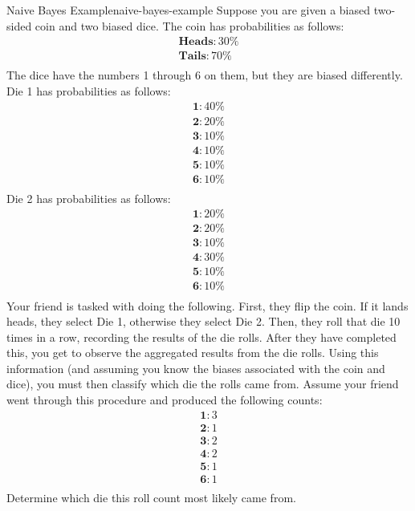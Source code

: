 \begin{example}{Naive Bayes Example}{naive-bayes-example}
	Suppose you are given a biased two-sided coin and two biased dice. The coin has probabilities as follows:
	\begin{align*}
		\textbf{Heads}: 30\% \\
		\textbf{Tails}: 70\% \\
	\end{align*}
	The dice have the numbers 1 through 6 on them, but they are biased differently. Die 1 has probabilities as follows:
	\begin{align*}
		\textbf{1}: 40\% \\
		\textbf{2}: 20\% \\
		\textbf{3}: 10\% \\
		\textbf{4}: 10\% \\
		\textbf{5}: 10\% \\
		\textbf{6}: 10\% \\
	\end{align*}
	Die 2 has probabilities as follows:
	\begin{align*}
		\textbf{1}: 20\% \\
		\textbf{2}: 20\% \\
		\textbf{3}: 10\% \\
		\textbf{4}: 30\% \\
		\textbf{5}: 10\% \\
		\textbf{6}: 10\% \\
	\end{align*}
	Your friend is tasked with doing the following. First, they flip the coin. If it lands heads, they select Die 1, otherwise they select Die 2. Then, they roll that die 10 times in a row, recording the results of the die rolls. After they have completed this, you get to observe the aggregated results from the die rolls. Using this information (and assuming you know the biases associated with the coin and dice), you must then classify which die the rolls came from. Assume your friend went through this procedure and produced the following counts:
	\begin{align*}
		\textbf{1}: 3 \\
		\textbf{2}: 1 \\
		\textbf{3}: 2 \\
		\textbf{4}: 2 \\
		\textbf{5}: 1 \\
		\textbf{6}: 1 \\
	\end{align*}
	Determine which die this roll count most likely came from. \newline \newline


\end{example}
